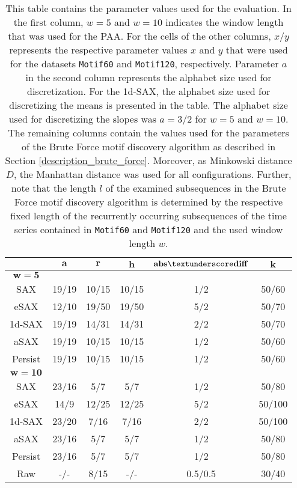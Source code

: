 \begin{table}[H]
\centering
\begin{tabular}{cccccc} 
\toprule
 & $\mathbf{a}$ & $\mathbf{r}$ & $\mathbf{h}$ & $\mathbf{abs \textunderscore diff}$ & $\mathbf{k}$ \\
\midrule
$\mathbf{w = 5}$ &  &  &  &  & \\
\ac{SAX} & 19/19 & 10/15 & 10/15 & 1/2 & 50/60 \\
\ac{eSAX} & 12/10 & 19/50 & 19/50 & 5/2 & 50/70 \\
\ac{1d-SAX} & 19/19 & 14/31 & 14/31 & 2/2  & 50/70 \\
\ac{aSAX} & 19/19 & 10/15 & 10/15 & 1/2 & 50/60 \\
Persist & 19/19 & 10/15 & 10/15 & 1/2 & 50/60 \\
\midrule
$\mathbf{w = 10}$ &  &  &  &  & \\
\ac{SAX} & 23/16 & 5/7 & 5/7 & 1/2 & 50/80 \\
\ac{eSAX} & 14/9 & 12/25 & 12/25 & 5/2 & 50/100 \\
\ac{1d-SAX} & 23/20 & 7/16 & 7/16 & 2/2 & 50/100 \\
\ac{aSAX} & 23/16 & 5/7 & 5/7 & 1/2 & 50/80 \\
Persist & 23/16 & 5/7 & 5/7 & 1/2 & 50/80 \\
\midrule
Raw & -/- & 8/15 & -/- & 0.5/0.5 & 30/40 \\
\bottomrule
\end{tabular}
\vspace*{0.5cm}
\caption[Evaluation - Parameters for the Brute Force]{This table contains the parameter values used for the evaluation. In the first column, $w = 5$ and $w = 10$ indicates the window length that was used for the \ac{PAA}. For the cells of the other columns, $x/y$ represents the respective parameter values $x$ and $y$ that were used for the datasets \texttt{Motif60} and \texttt{Motif120}, respectively. Parameter $a$ in the second column represents the alphabet size used for discretization. For the \ac{1d-SAX}, the alphabet size used for discretizing the means is presented in the table. The alphabet size used for discretizing the slopes was $a = 3/2$ for $w = 5$ and $w = 10$. The remaining columns contain the values used for the parameters of the Brute Force motif discovery algorithm as described in Section \ref{description_brute_force}. Moreover, as Minkowski distance $D$, the Manhattan distance was used for all configurations. Further, note that the length $l$ of the examined subsequences in the Brute Force motif discovery algorithm is determined by the respective fixed length of the recurrently occurring subsequences of the time series contained in \texttt{Motif60} and \texttt{Motif120} and the used window length $w$.}
\label{tab:params_brute_force}
\end{table}
